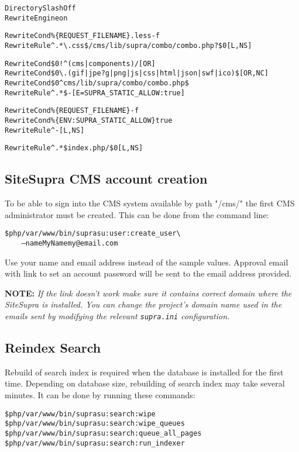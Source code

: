\documentclass[12pt]{article}
\newcommand{\vigShowNotes}{1}
\newcommand{\vigPathToProject}{/var/www}
\newcommand{\note}[1]{
\textbf{NOTE:} 
\textit{#1}
}
\begin{document}
\begin{alltt}
  DirectorySlash Off
  RewriteEngine on
  
  RewriteCond \%\{REQUEST_FILENAME\}.less -f
  RewriteRule ^.*\textbackslash.css\$ /cms/lib/supra/combo/combo.php?\$0 [L,NS]

  RewriteCond \$0 !^(cms|components)/ [OR]
  RewriteCond \$0 {\textbackslash}.(gif|jpe?g|png|js|css|html|json|swf|ico)\$ [OR,NC]
  RewriteCond \$0 ^cms/lib/supra/combo/combo.php\$
  RewriteRule ^.*\$ - [E=SUPRA_STATIC_ALLOW:true]
  
  RewriteCond \%\{REQUEST_FILENAME\} -f
  RewriteCond \%\{ENV:SUPRA_STATIC_ALLOW\} true
  RewriteRule ^ - [L,NS]

  RewriteRule ^.*\$ index.php/\$0 [L,NS]
\end{alltt}

\subsection{SiteSupra CMS account creation}

To be able to sign into the CMS system available by path "/cms/" the first CMS administrator must be created. This can be done from the command line:

\begin{alltt}
\$ php /var/www/bin/supra su:user:create_user \textbackslash
\ \ \ \ --name MyName my@email.com
\end{alltt}

Use your name and email address instead of the sample values. 
Approval email with link to set an account password will be sent to the email address provided.

\note{If the link doesn't work make sure it contains correct domain where the SiteSupra is installed. You can change the project's domain name used in the emails sent by modifying the relevant \texttt{supra.ini} configuration.}

\subsection{Reindex Search\label{reindexSearch}}
Rebuild of search index is required when the database is installed for the first time. Depending on database size, rebuilding of search index may take several minutes. It can be done by running these commands:

\begin{alltt}
\$ php \vigPathToProject/bin/supra su:search:wipe
\$ php \vigPathToProject/bin/supra su:search:wipe_queues
\$ php \vigPathToProject/bin/supra su:search:queue_all_pages
\$ php \vigPathToProject/bin/supra su:search:run_indexer
\end{alltt}
\end{document}
